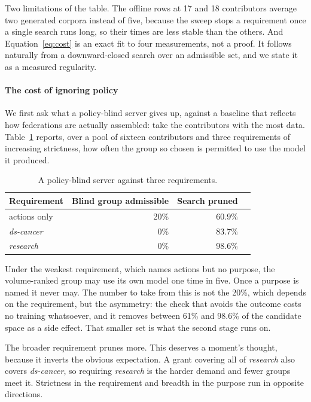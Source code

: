 \documentclass[10pt,conference]{IEEEtran}
\begin{document}
Two limitations of the table. The offline rows at 17 and 18 contributors
average two generated corpora instead of five, because the sweep stops a
requirement once a single search runs long, so their times are less stable than
the others. And Equation~\ref{eq:cost} is an exact fit to four measurements,
not a proof. It follows naturally from a downward-closed search over an
admissible set, and we state it as a measured regularity.

\paragraph{The cost of ignoring policy}

We first ask what a policy-blind server gives up, against a baseline that
reflects how federations are actually assembled: take the contributors with the
most data. Table~\ref{tab:blind} reports, over a pool of sixteen contributors
and three requirements of increasing strictness, how often the group so chosen
is permitted to use the model it produced.

\begin{table}[t]
\caption{A policy-blind server against three requirements.}
\label{tab:blind}
\centering
\begin{tabular}{lrrr}
\toprule
Requirement & Blind group admissible & Search pruned \\
\midrule
actions only & 20\% & 60.9\% \\
\emph{ds-cancer} & 0\% & 83.7\% \\
\emph{research} & 0\% & 98.6\% \\
\bottomrule
\end{tabular}
\end{table}

Under the weakest requirement, which names actions but no purpose, the
volume-ranked group may use its own model one time in five. Once a purpose is
named it never may. The number to take from this is not the 20\%, which depends
on the requirement, but the asymmetry: the check that avoids the outcome costs
no training whatsoever, and it removes between 61\% and 98.6\% of the candidate
space as a side effect. That smaller set is what the second stage runs on.

The broader requirement prunes more. This deserves a moment's thought, because
it inverts the obvious expectation. A grant covering all of \emph{research} also
covers \emph{ds-cancer}, so requiring \emph{research} is the harder demand and
fewer groups meet it. Strictness in the requirement and breadth in the purpose
run in opposite directions.
\end{document}
